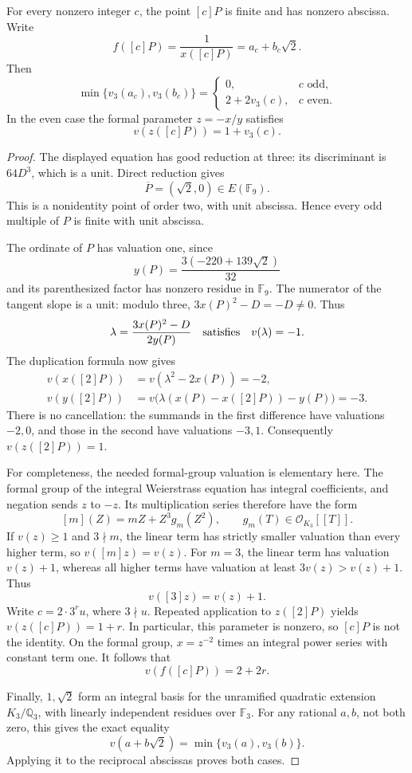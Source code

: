\begin{proposition}\label{anchor3:exact-depth}
For every nonzero integer $c$, the point $[c]P$ is finite and has
nonzero abscissa.  Write
\[
             f([c]P)=\frac1{x([c]P)}=a_c+b_c\sqrt2.
\]
Then
\[
 \min\{v_3(a_c),v_3(b_c)\}=
 \begin{cases}
 0,&c\text{ odd},\\
 2+2v_3(c),&c\text{ even}.
 \end{cases}
\]
In the even case the formal parameter $z=-x/y$ satisfies
\[
                  v(z([c]P))=1+v_3(c).
\]
\end{proposition}
\begin{proof}
The displayed equation has good reduction at three: its discriminant is
$64D^3$, which is a unit.  Direct reduction gives
\[
             \overline P=(\sqrt2,0)\in E(\mathbb F_9).
\]
This is a nonidentity point of order two, with unit abscissa.  Hence
every odd multiple of $P$ is finite with unit abscissa.

The ordinate of $P$ has valuation one, since
\[
 y(P)=\frac{3(-220+139\sqrt2)}{32}
\]
and its parenthesized factor has nonzero residue in $\mathbb F_9$.
The numerator of the tangent slope is a unit: modulo three,
$3x(P)^2-D=-D\ne0$.  Thus
\[
 \lambda=\frac{3x(P)^2-D}{2y(P)}
 \quad\hbox{satisfies}\quad v(\lambda)=-1.
\]
The duplication formula now gives
\[
 \begin{split}
 v(x([2]P))&=v(\lambda^2-2x(P))=-2,\\
 v(y([2]P))&=v\bigl(\lambda(x(P)-x([2]P))-y(P)\bigr)=-3.
 \end{split}
\]
There is no cancellation: the summands in the first difference have
valuations $-2,0$, and those in the second have valuations $-3,1$.
Consequently $v(z([2]P))=1$.

For completeness, the needed formal-group valuation is elementary here.
The formal group of the integral Weierstrass equation has integral
coefficients, and negation sends $z$ to $-z$.  Its multiplication series
therefore have the form
\[
                  [m](Z)=mZ+Z^3g_m(Z^2),
                  \qquad g_m(T)\in\mathcal O_{K_3}[[T]].
\]
If $v(z)\ge1$ and $3\nmid m$, the linear term has strictly smaller
valuation than every higher term, so $v([m]z)=v(z)$.
For $m=3$, the linear term has valuation $v(z)+1$, whereas all higher
terms have valuation at least $3v(z)>v(z)+1$.  Thus
\[
                    v([3]z)=v(z)+1.
\]
Write $c=2\cdot3^ru$, where $3\nmid u$.  Repeated application to
$z([2]P)$ yields $v(z([c]P))=1+r$.  In particular, this parameter
is nonzero, so $[c]P$ is not the identity.  On the formal group,
$x=z^{-2}$ times an integral power series with constant term one.
It follows that
\[
                    v(f([c]P))=2+2r.
\]

Finally, $1,\sqrt2$ form an integral basis for the unramified quadratic
extension $K_3/\mathbb Q_3$, with linearly independent residues over
$\mathbb F_3$.  For any rational $a,b$, not both zero, this gives the
exact equality
\[
                  v(a+b\sqrt2)=\min\{v_3(a),v_3(b)\}.
\]
Applying it to the reciprocal abscissas proves both cases.
\end{proof}


